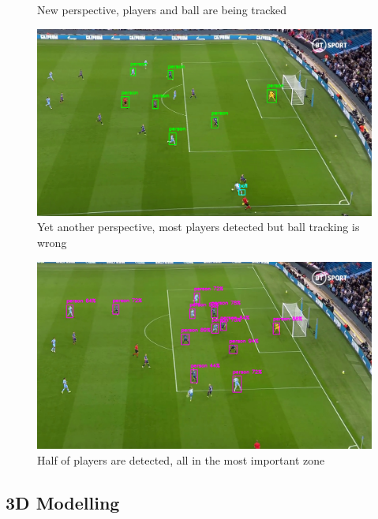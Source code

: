 \documentclass[
    11pt,
    oneside
]{report}
\begin{document}
\begin{appendices}
\begin{figure}[H]
    \caption{New perspective, players and ball are being tracked}
    \label{img:14}
\end{figure}
\begin{figure}[H]
    \includegraphics[keepaspectratio, width=\columnwidth]{Screenshot_2022-03-03_23-12-29.png}
    \caption{Yet another perspective, most players detected but ball tracking is wrong}
    \label{img:15}
\end{figure}
\begin{figure}[H]
    \includegraphics[keepaspectratio, width=\columnwidth]{Screenshot_2022-03-03_23-13-18.png}
    \caption{Half of players are detected, all in the most important zone}
    \label{img:16}
\end{figure}



\subsection{3D Modelling}




\end{appendices}
\end{document}
